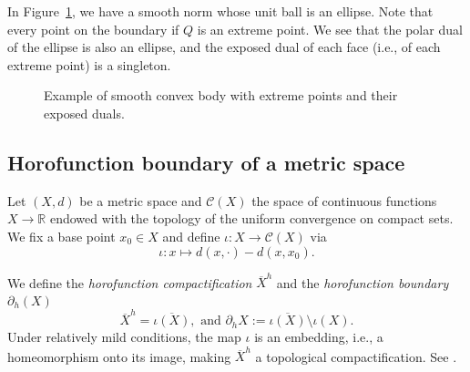 \documentclass{article}
\theoremstyle{definition}
\newcommand{\bhor}{\partial_h}
\newcommand{\R}{{\mathbb R}}
\newcommand{\cC}{{\mathcal C}}
\begin{document}
In Figure~\ref{fig:smooth}, we have a smooth norm whose unit ball is an ellipse. Note that every point on the boundary if $Q$ is an extreme point. 
We see that the polar dual of the ellipse is also an ellipse, and the exposed dual of each face (i.e., of each extreme point) is a singleton.



\begin{figure}[h]
\centering
{}
\caption{Example of smooth convex body with extreme points and their exposed duals.}\label{fig:smooth}
\end{figure}




\subsection{Horofunction boundary of a metric space}\label{sec:horobdry}
Let $(X,d)$ be a metric space and $\cC(X)$ the space of continuous functions $X\to\R$ endowed with the topology of the uniform convergence on compact sets.
We fix a base point $x_0 \in X$ and define $\iota: X \to \cC(X)$ via 
\[
\iota: x \mapsto d(x, \cdot) - d(x, x_0).\] 

We define the \emph{horofunction compactification} $\overline{X}^h$ and the \emph{horofunction boundary} $\bhor(X)$
\[
\overline{X}^h = \overline{\iota(X)}, \text{  and  } \bhor X := \overline{\iota(X)} \setminus \iota(X).
\]
Under relatively mild conditions, the map $\iota$ is an embedding, i.e., a homeomorphism onto its image, making $\overline{X}^h$ a topological compactification. See \cite{kramer, FNG}. 
\end{document}
